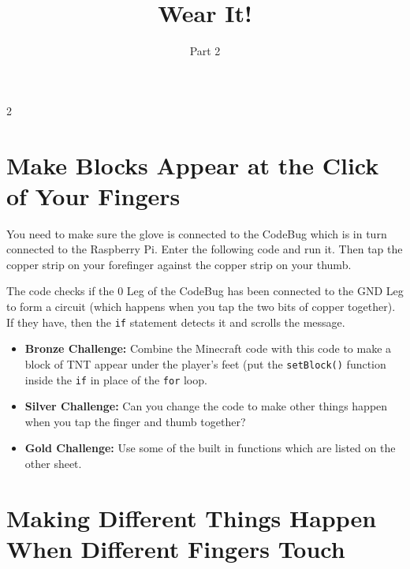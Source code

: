 \documentclass{geocraft-worksheet-multipage}
\begin{document}
\title{Wear It!}
\subtitle{Part 2}

\date{}

\maketitle

\setcounter {section} {2}

\section{Make Blocks Appear at the Click of  Your Fingers}
\lstset{language=Python}

You need to make sure the glove is connected to the CodeBug which is in turn connected to the Raspberry Pi. Enter the
following code and run it. Then tap the copper strip on your forefinger against the copper strip on your thumb.

\noindent%
%
\vspace{0.2cm}
%
%

\noindent The code checks if the 0 Leg of the CodeBug has been connected to the GND Leg to form a circuit (which happens
when you tap the two bits of copper together). If they have, then the \lstinline{if} statement detects it and scrolls the
message.

\begin{itemize}
\item\textbf{Bronze Challenge:} Combine the Minecraft code with this code to make a block of TNT appear under the
  player's feet (put the \lstinline{setBlock()} function inside the \lstinline{if} in place of the \lstinline{for}
  loop. 
\item\textbf{Silver Challenge:} Can you change the code to make other things happen when you tap the finger and thumb
  together?
\item\textbf{Gold Challenge:} Use some of the built in functions which are listed on the other sheet.
\end{itemize}

\newpage

\section{Making Different Things Happen When Different Fingers Touch}

\noindent%
%
\vspace{0.2cm}
%
%
\end{document}
